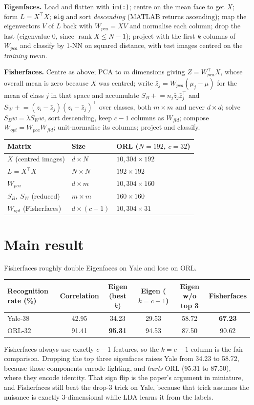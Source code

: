 \documentclass[11pt]{article}
\newcommand{\T}{^{\top}}
\begin{document}
\textbf{Eigenfaces.} Load and flatten with \texttt{im(:)}; centre on the mean face to get $X$; form $L=X\T X$; \texttt{eig} and sort \emph{descending} (MATLAB returns ascending); map the eigenvectors $V$ of $L$ back with $W_{pca}=XV$ and normalise each column; drop the last (eigenvalue 0, since $\operatorname{rank}X\le N-1$); project with the first $k$ columns of $W_{pca}$ and classify by 1-NN on squared distance, with test images centred on the \emph{training} mean.

\textbf{Fisherfaces.} Centre as above; PCA to $m$ dimensions giving $Z=W_{pca}\T X$, whose overall mean is zero because $X$ was centred; write $\bar z_j=W_{pca}\T(\mu_j-\mu)$ for the mean of class $j$ in that space and accumulate $S_B\mathrel{+}=n_j\bar z_j\bar z_j\T$ and $S_W\mathrel{+}=(z_i-\bar z_j)(z_i-\bar z_j)\T$ over classes, both $m\times m$ and never $d\times d$; solve $S_Bw=\lambda S_Ww$, sort descending, keep $c-1$ columns as $W_{fld}$; compose $W_{opt}=W_{pca}W_{fld}$; unit-normalise its columns; project and classify.

\begin{center}
\begin{tabular}{@{}lll@{}}\toprule
Matrix & Size & ORL ($N=192$, $c=32$)\\\midrule
$X$ (centred images) & $d\times N$ & $10{,}304\times192$\\
$L=X\T X$ & $N\times N$ & $192\times192$\\
$W_{pca}$ & $d\times m$ & $10{,}304\times160$\\
$S_B,\ S_W$ (reduced) & $m\times m$ & $160\times160$\\
$W_{opt}$ (Fisherfaces) & $d\times(c-1)$ & $10{,}304\times31$\\\bottomrule
\end{tabular}
\end{center}

\section{Main result}
Fisherfaces roughly double Eigenfaces on Yale and lose on ORL.
\begin{center}\small
\begin{tabular}{@{}lccccc@{}}\toprule
Recognition rate (\%) & Correlation & Eigen (best $k$) & Eigen ($k{=}c{-}1$) & Eigen w/o top 3 & Fisherfaces\\\midrule
Yale-38 & 42.95 & 34.23 & 29.53 & 58.72 & \textbf{67.23}\\
ORL-32 & 91.41 & \textbf{95.31} & 94.53 & 87.50 & 90.62\\\bottomrule
\end{tabular}
\end{center}
Fisherfaces always use exactly $c-1$ features, so the $k=c-1$ column is the fair comparison. Dropping the top three eigenfaces raises Yale from 34.23 to 58.72, because those components encode lighting, and \emph{hurts} ORL (95.31 to 87.50), where they encode identity. That sign flip is the paper's argument in miniature, and Fisherfaces still beat the drop-3 trick on Yale, because that trick assumes the nuisance is exactly 3-dimensional while LDA learns it from the labels.
\end{document}
